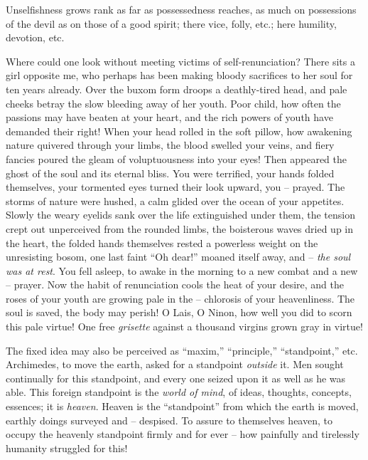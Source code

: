 \documentclass[12pt,a4paper]{book}
\begin{document}
Unselfishness grows rank as far as possessedness reaches, as much on 
possessions of the devil as on those of a good spirit; there vice, folly, 
etc.; here humility, devotion, etc.

Where could one look without meeting victims of self-renunciation? There sits 
a girl opposite me, who perhaps has been making bloody sacrifices to her soul 
for ten years already. Over the buxom form droops a deathly-tired head, and 
pale cheeks betray the slow bleeding away of her youth. Poor child, how often 
the passions may have beaten at your heart, and the rich powers of youth have 
demanded their right! When your head rolled in the soft pillow, how awakening 
nature quivered through your limbs, the blood swelled your veins, and fiery 
fancies poured the gleam of voluptuousness into your eyes! Then appeared the 
ghost of the soul and its eternal bliss. You were terrified, your hands folded 
themselves, your tormented eyes turned their look upward, you -- prayed. The 
storms of nature were hushed, a calm glided over the ocean of your appetites. 
Slowly the weary eyelids sank over the life extinguished under them, the 
tension crept out unperceived from the rounded limbs, the boisterous waves 
dried up in the heart, the folded hands themselves rested a powerless weight 
on the unresisting bosom, one last faint ``Oh dear!'' moaned itself away, 
and -- \textit{the soul was at rest}. You fell asleep, to awake in the morning 
to a new combat and a new -- prayer. Now the habit of renunciation cools the 
heat of your desire, and the roses of your youth are growing pale in the -- 
chlorosis of your heavenliness. The soul is saved, the body may perish! O 
Lais, O Ninon, how well you did to scorn this pale virtue! One free 
\textit{grisette} against a thousand virgins grown gray in virtue!

The fixed idea may also be perceived as ``maxim,'' ``principle,'' 
``standpoint,'' etc. Archimedes, to move the earth, asked for a standpoint 
\textit{outside} it. Men sought continually for this standpoint, and every one 
seized upon it as well as he was able. This foreign standpoint is the 
\textit{world of mind}, of ideas, thoughts, concepts, essences; it is 
\textit{heaven}. Heaven is the ``standpoint'' from which the earth is moved, 
earthly doings surveyed and -- despised. To assure to themselves heaven, to 
occupy the heavenly standpoint firmly and for ever -- how painfully and 
tirelessly humanity struggled for this!
\end{document}
